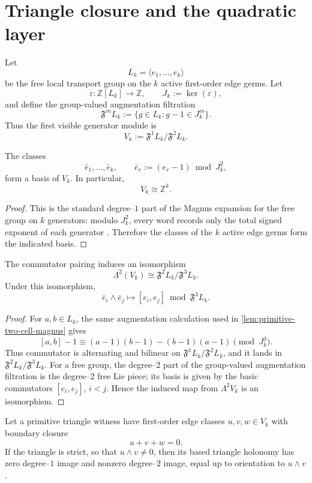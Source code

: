 \section{Triangle closure and the quadratic layer}
\label{sec:triangle-quadratic}
Let
\[
	L_k=\langle e_1,\dots,e_k\rangle
\]
be the free local transport group on the \(k\) active first-order edge
germs.  Let
\[
	\varepsilon:\mathbb Z[L_k]\to \mathbb Z,
	\qquad
	J_k:=\ker(\varepsilon),
\]
and define the group-valued augmentation filtration
\[
	\mathfrak F^mL_k:=\{g\in L_k:g-1\in J_k^m\}.
\]
Thus the first visible generator module is
\[
	V_k:=\mathfrak F^1L_k/\mathfrak F^2L_k.
\]
\begin{lemma}
The classes
\[
	\bar e_1,\dots,\bar e_k,
	\qquad
	\bar e_r:=(e_r-1)\bmod J_k^2,
\]
form a basis of \(V_k\).  In particular,
\[
	V_k\cong \mathbb Z^k.
\]
\end{lemma}
\begin{proof}
This is the standard degree--\(1\) part of the Magnus expansion for the
free group on \(k\) generators: modulo \(J_k^2\), every word records only
the total signed exponent of each generator \cite{Magnus1935}.  Therefore the classes of the
\(k\) active edge germs form the indicated basis.
\end{proof}
\begin{lemma}
\label{lem:quadratic-commutator-carrier}
The commutator pairing induces an isomorphism
\[
	\Lambda^2(V_k)
	\cong
	\mathfrak F^2L_k/\mathfrak F^3L_k.
\]
Under this isomorphism,
\[
	\bar e_i\wedge \bar e_j
	\longmapsto
	[e_i,e_j]\bmod \mathfrak F^3L_k.
\]
\end{lemma}
\begin{proof}
For \(a,b\in L_k\), the same augmentation calculation used in
\cref{lem:primitive-two-cell-magnus} gives
\[
	[a,b]-1\equiv (a-1)(b-1)-(b-1)(a-1)\pmod {J_k^3}.
\]
Thus commutator is alternating and bilinear on
\(\mathfrak F^1L_k/\mathfrak F^2L_k\), and it lands in
\(\mathfrak F^2L_k/\mathfrak F^3L_k\).  For a free group, the degree--\(2\)
part of the group-valued augmentation filtration is the degree--\(2\)
free Lie piece; its basis is given by the basic commutators
\([e_i,e_j]\), \(i<j\).  Hence the induced map from \(\Lambda^2V_k\) is an
isomorphism.
\end{proof}
\begin{lemma}
\label{lem:primitive-triangle-degree-two}
Let a primitive triangle witness have first-order edge classes
\(u,v,w\in V_k\) with boundary closure
\[
	u+v+w=0.
\]
If the triangle is strict, so that \(u\wedge v\neq0\), then its based
triangle holonomy has zero degree--\(1\) image and nonzero degree--\(2\)
image, equal up to orientation to \(u\wedge v\).
\end{lemma}
